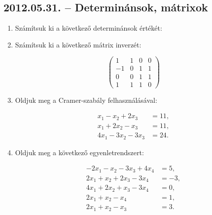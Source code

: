 \subsection*{2012.05.31. -- Determinánsok, mátrixok}
\begin{enumerate}
\item Számítsuk ki a következő determinánsok értékét:

\item Számítsuk ki a következő mátrix inverzét:

$$
\begin{pmatrix}
1&1&0&0\\
-1&0&1&1\\
0&0&1&1\\
1&1&1&0
\end{pmatrix}
$$

\item Oldjuk meg a Cramer-szabály felhasználásával:

\begin{align*}
x_1-x_2+2x_3&=11,\\
x_1+2x_2-x_3&=11,\\
4x_1-3x_2-3x_3&=24.
\end{align*}

\item Oldjuk meg a következő egyenletrendszert:

\begin{align*}
-2x_1-x_2-3x_3+4x_4&=5,\\
2x_1+x_2+2x_3-3x_4&=-3,\\
4x_1+2x_2+x_3-3x_4&=0,\\
2x_1+x_2-x_4&=1,\\
2x_1+x_2-x_3&=3.
\end{align*}
\end{enumerate}















